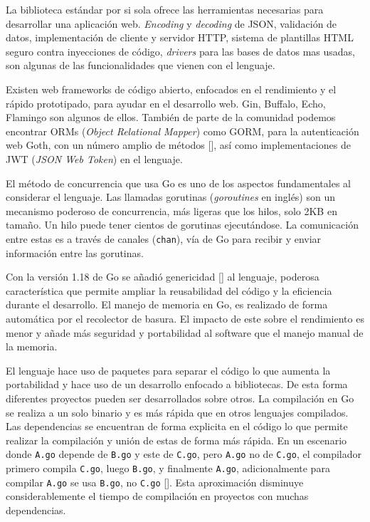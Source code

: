 La biblioteca estándar por si sola ofrece las herramientas necesarias para desarrollar una aplicación web. \textit{Encoding} y \textit{decoding} de JSON, validación de datos, implementación de cliente y servidor HTTP, sistema de plantillas HTML seguro contra inyecciones de código, \textit{drivers} para las bases de datos mas usadas, son algunas de las funcionalidades que vienen con el lenguaje.

Existen web frameworks de código abierto, enfocados en el rendimiento y el rápido prototipado, para ayudar en el desarrollo web. Gin, Buffalo, Echo, Flamingo son algunos de ellos. También de parte de la comunidad podemos encontrar ORMs (\textit{Object Relational Mapper}) como GORM, para la autenticación web Goth, con un número amplio de métodos [\cite{goth}], así como implementaciones de JWT (\textit{JSON Web Token}) en el lenguaje.

El método de concurrencia que usa Go es uno de los aspectos fundamentales al considerar el lenguaje. Las llamadas gorutinas (\textit{goroutines} en inglés) son un mecanismo poderoso de concurrencia, más ligeras que los hilos, solo 2KB en tamaño. Un hilo puede tener cientos de gorutinas ejecutándose. La comunicación entre estas es a través de canales (\verb+chan+), vía de Go para recibir y enviar información entre las gorutinas.

Con la versión 1.18 de Go se añadió genericidad [\cite{go-generics}] al lenguaje, poderosa característica que permite ampliar la reusabilidad del código y la eficiencia durante el desarrollo. El manejo de memoria en Go, es realizado de forma automática por el recolector de basura. El impacto de este sobre el rendimiento es menor y añade más seguridad y portabilidad al software que el manejo manual de la memoria.

El lenguaje hace uso de paquetes para separar el código lo que aumenta la portabilidad y hace uso de un desarrollo enfocado a bibliotecas. De esta forma diferentes proyectos pueden ser desarrollados sobre otros. La compilación en Go se realiza a un solo binario y es más rápida que en otros lenguajes compilados. Las dependencias se encuentran de forma explicita en el código lo que permite realizar la compilación y unión de estas de forma más rápida. En un escenario donde \verb+A.go+ depende de \verb+B.go+ y este de \verb+C.go+, pero \verb+A.go+ no de \verb+C.go+, el compilador primero compila \verb+C.go+, luego \verb+B.go+, y finalmente \verb+A.go+, adicionalmente para compilar \verb+A.go+ se usa \verb+B.go+, no \verb+C.go+ [\cite{go-deps}]. Esta aproximación disminuye considerablemente el tiempo de compilación en proyectos con muchas dependencias.

